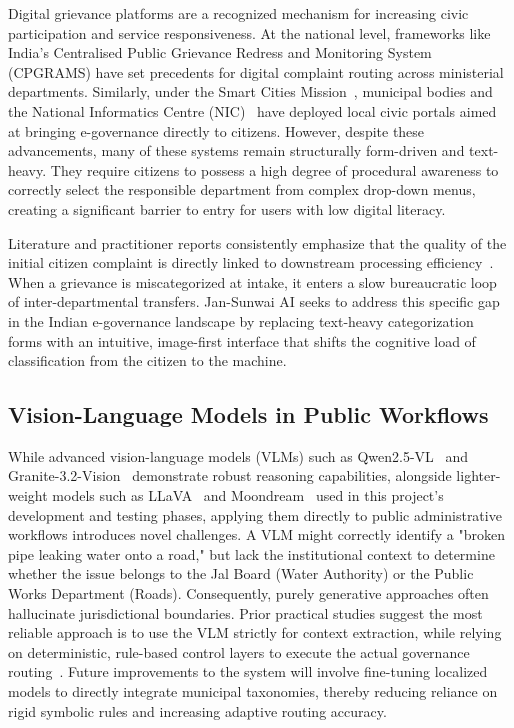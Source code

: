 Digital grievance platforms are a recognized mechanism for increasing civic participation and service responsiveness. At the national level, frameworks like India's Centralised Public Grievance Redress and Monitoring System (CPGRAMS) have set precedents for digital complaint routing across ministerial departments. Similarly, under the Smart Cities Mission~\cite{smart_cities_mission}, municipal bodies and the National Informatics Centre (NIC)~\cite{nic_portal} have deployed local civic portals aimed at bringing e-governance directly to citizens. However, despite these advancements, many of these systems remain structurally form-driven and text-heavy. They require citizens to possess a high degree of procedural awareness to correctly select the responsible department from complex drop-down menus, creating a significant barrier to entry for users with low digital literacy.

Literature and practitioner reports consistently emphasize that the quality of the initial citizen complaint is directly linked to downstream processing efficiency~\cite{un_e_gov, world_bank_digital_governance}. When a grievance is miscategorized at intake, it enters a slow bureaucratic loop of inter-departmental transfers. Jan-Sunwai AI seeks to address this specific gap in the Indian e-governance landscape by replacing text-heavy categorization forms with an intuitive, image-first interface that shifts the cognitive load of classification from the citizen to the machine.

\subsection{Vision-Language Models in Public Workflows}

While advanced vision-language models (VLMs) such as Qwen2.5-VL~\cite{qwen_2p5vl} and Granite-3.2-Vision~\cite{granite_vision} demonstrate robust reasoning capabilities, alongside lighter-weight models such as LLaVA~\cite{llava_model} and Moondream~\cite{moondream} used in this project's development and testing phases, applying them directly to public administrative workflows introduces novel challenges. A VLM might correctly identify a "broken pipe leaking water onto a road," but lack the institutional context to determine whether the issue belongs to the Jal Board (Water Authority) or the Public Works Department (Roads). Consequently, purely generative approaches often hallucinate jurisdictional boundaries. Prior practical studies suggest the most reliable approach is to use the VLM strictly for context extraction, while relying on deterministic, rule-based control layers to execute the actual governance routing~\cite{neuro_symbolic}. Future improvements to the system will involve fine-tuning localized models to directly integrate municipal taxonomies, thereby reducing reliance on rigid symbolic rules and increasing adaptive routing accuracy.

